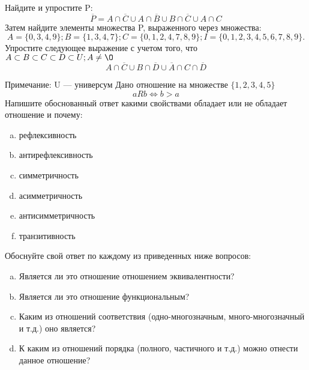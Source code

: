 \documentclass[10pt]{exam}
\begin{document}
\begin{questions}
\question
Найдите и упростите P:
\begin{equation*}
\overline{P} = A \cap \overline{C} \cup A \cap \overline{B} \cup B \cap \overline{C} \cup A \cap C
\end{equation*}
Затем найдите элементы множества P, выраженного через множества:
\begin{equation*}
A = \{0, 3, 4, 9\}; 
B = \{1, 3, 4, 7\};
C = \{0, 1, 2, 4, 7, 8, 9\};
I = \{0, 1, 2, 3, 4, 5, 6, 7, 8, 9\}.
\end{equation*}\question
Упростите следующее выражение с учетом того, что $A\subset B \subset C \subset D \subset U; A \neq \O$
\begin{equation*}
A \cap  \overline{C} \cup B \cap \overline{D} \cup  \overline{A} \cap C \cap  \overline{D}
\end{equation*}

Примечание: U — универсум\question
Дано отношение на множестве $\{1, 2, 3, 4, 5\}$ 
\begin{equation*}
aRb \iff b > a
\end{equation*}
Напишите обоснованный ответ какими свойствами обладает или не обладает отношение и почему:   
\begin{enumerate} [a)]\setcounter{enumi}{0}
\item рефлексивность
\item антирефлексивность
\item симметричность
\item асимметричность
\item антисимметричность
\item транзитивность
\end{enumerate}

Обоснуйте свой ответ по каждому из приведенных ниже вопросов:
\begin{enumerate} [a)]\setcounter{enumi}{0}
    \item Является ли это отношение отношением эквивалентности?
    \item Является ли это отношение функциональным?
    \item Каким из отношений соответствия (одно-многозначным, много-многозначный и т.д.) оно является?
    \item К каким из отношений порядка (полного, частичного и т.д.) можно отнести данное отношение?
\end{enumerate}


\end{questions}
\end{document}
